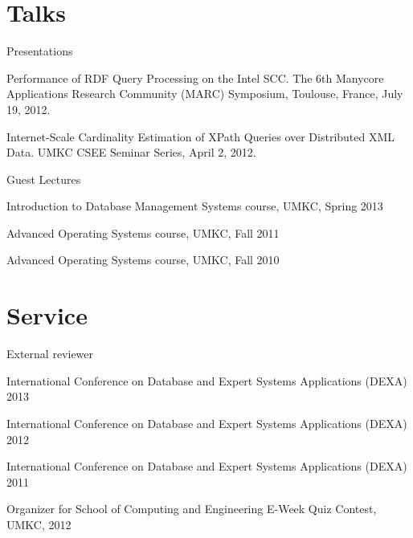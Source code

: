 \documentclass[margin,line]{resume}
\begin{document}
\begin{resume}
    \section{\mysidestyle Talks}
    \begin{list2}
    \item Presentations
    \begin{list3}
    \item Performance of RDF Query Processing on the Intel SCC. The 6th Manycore Applications Research Community (MARC) Symposium, Toulouse, France, July 19, 2012.
    \item Internet-Scale Cardinality Estimation of XPath Queries over Distributed XML Data. UMKC CSEE Seminar Series, April 2, 2012.
    \end{list3}
    \item Guest Lectures
    \begin{list3}
    \item Introduction to Database Management Systems course, UMKC, Spring 2013
    \item Advanced Operating Systems course, UMKC, Fall 2011
    \item Advanced Operating Systems course, UMKC, Fall 2010
    \end{list3}
    \end{list2}

    \section{\mysidestyle Service}
    \begin{list2}
    \item External reviewer
    \begin{list3}
    \item International Conference on Database and Expert Systems Applications (DEXA) 2013
    \item International Conference on Database and Expert Systems Applications (DEXA) 2012
    \item International Conference on Database and Expert Systems Applications (DEXA) 2011
    \end{list3}
    \item Organizer for School of Computing and Engineering E-Week Quiz Contest, UMKC, 2012
    \end{list2}
 
\end{resume}
\end{document}
